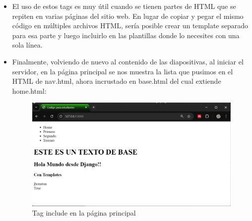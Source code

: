 \documentclass{article}
\begin{document}
\begin{itemize}
            \item El uso de estos tags es muy útil cuando se tienen partes de HTML que se repiten en varias páginas del sitio web. En lugar de copiar y pegar el mismo código en múltiples archivos HTML, sería posible crear un template separado para esa parte y luego incluirlo en las plantillas donde lo necesites con una sola línea.
    \clearpage
            \item Finalmente, volviendo de nuevo al contenido de las diapositivas, al iniciar el servidor, en la página principal se nos muestra la lista que pusimos en el HTML de nav.html, ahora incrustado en base.html del cual extiende home.html:
        \begin{figure}[H]
            \centering
            \includegraphics[width=1\linewidth]{img/Tag_include.png}
            \caption{Tag include en la página principal}
            \label{fig:enter-label}
        \end{figure}

        \end{itemize}
\end{document}
